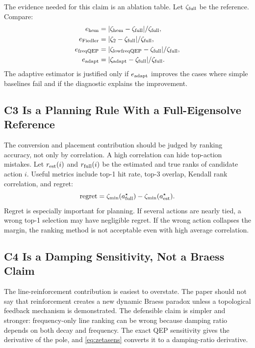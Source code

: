 \documentclass[journal]{IEEEtran}
\begin{document}
The evidence needed for this claim is an ablation table. Let $\zeta_{\rm full}$ be the reference. Compare:
\begin{align}
e_{\rm hom} &= |\zeta_{\rm hom}-\zeta_{\rm full}|/\zeta_{\rm full},\\
e_{\rm Fiedler} &= |\zeta_{2}-\zeta_{\rm full}|/\zeta_{\rm full},\\
e_{\rm freqQEP} &= |\zeta_{\rm lowfreqQEP}-\zeta_{\rm full}|/\zeta_{\rm full},\\
e_{\rm adapt} &= |\zeta_{\rm adapt}-\zeta_{\rm full}|/\zeta_{\rm full}.
\end{align}
The adaptive estimator is justified only if $e_{\rm adapt}$ improves the cases where simple baselines fail and if the diagnostic explains the improvement.

\subsection{C3 Is a Planning Rule With a Full-Eigensolve Reference}

The conversion and placement contribution should be judged by ranking accuracy, not only by correlation. A high correlation can hide top-action mistakes. Let $r_{\rm est}(i)$ and $r_{\rm full}(i)$ be the estimated and true ranks of candidate action $i$. Useful metrics include top-1 hit rate, top-3 overlap, Kendall rank correlation, and regret:
\begin{equation}
\operatorname{regret}=
\zeta_{\min}(a^\star_{\rm full})-\zeta_{\min}(a^\star_{\rm est}).
\end{equation}
Regret is especially important for planning. If several actions are nearly tied, a wrong top-1 selection may have negligible regret. If the wrong action collapses the margin, the ranking method is not acceptable even with high average correlation.

\subsection{C4 Is a Damping Sensitivity, Not a Braess Claim}

The line-reinforcement contribution is easiest to overstate. The paper should not say that reinforcement creates a new dynamic Braess paradox unless a topological feedback mechanism is demonstrated. The defensible claim is simpler and stronger: frequency-only line ranking can be wrong because damping ratio depends on both decay and frequency. The exact QEP sensitivity gives the derivative of the pole, and \eqref{eq:zetasens} converts it to a damping-ratio derivative.
\end{document}
